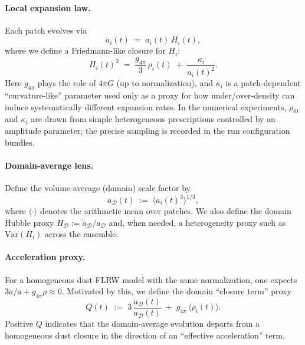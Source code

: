 \documentclass[11pt]{article}
\theoremstyle{definition}
\theoremstyle{plain}
\theoremstyle{remark}
\begin{document}
\paragraph{Local expansion law.}
Each patch evolves via
\begin{equation}
\dot a_i(t) \;=\; a_i(t)\,H_i(t),
\label{eq:toy2_ai_ode}
\end{equation}
where we define a Friedmann-like closure for $H_i$:
\begin{equation}
H_i(t)^2 \;=\; \frac{g_{4\pi}}{3}\,\rho_i(t) \;+\; \frac{\kappa_i}{a_i(t)^2}.
\label{eq:toy2_hi_closure}
\end{equation}
Here $g_{4\pi}$ plays the role of $4\pi G$ (up to normalization), and $\kappa_i$ is a patch-dependent ``curvature-like'' parameter used only as a proxy for how under/over-density can induce systematically different expansion rates. In the numerical experiments, $\rho_{i0}$ and $\kappa_i$ are drawn from simple heterogeneous prescriptions controlled by an amplitude parameter; the precise sampling is recorded in the run configuration bundles.

\paragraph{Domain-average lens.}
Define the volume-average (domain) scale factor by
\begin{equation}
a_{\mathcal{D}}(t) \;:=\; \Big\langle a_i(t)^3\Big\rangle^{1/3},
\label{eq:toy2_aD}
\end{equation}
where $\langle\cdot\rangle$ denotes the arithmetic mean over patches.
We also define the domain Hubble proxy $H_{\mathcal{D}}:=\dot a_{\mathcal{D}}/a_{\mathcal{D}}$ and, when needed, a heterogeneity proxy such as $\mathrm{Var}(H_i)$ across the ensemble.

\paragraph{Acceleration proxy.}
For a homogeneous dust FLRW model with the same normalization, one expects $3\ddot a/a + g_{4\pi}\rho \approx 0$.
Motivated by this, we define the domain ``closure term'' proxy
\begin{equation}
Q(t) \;:=\; 3\,\frac{\ddot a_{\mathcal{D}}(t)}{a_{\mathcal{D}}(t)} \;+\; g_{4\pi}\,\big\langle \rho_i(t)\big\rangle.
\label{eq:toy2_Q_def}
\end{equation}
Positive $Q$ indicates that the domain-average evolution departs from a homogeneous dust closure in the direction of an ``effective acceleration'' term.
\end{document}
